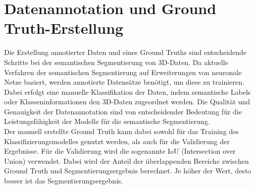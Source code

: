 \section{Datenannotation und Ground Truth-Erstellung}

Die Erstellung annotierter Daten und eines Ground Truths sind entscheidende
Schritte bei der semantischen Segmentierung von 3D-Daten. Da aktuelle Verfahren
der semantischen Segmentierung auf Erweiterungen von neuronale Netze basiert,
werden annotierte Datensätze benötigt, um diese zu trainieren. Dabei erfolgt
eine manuelle Klassifikation der Daten, indem semantische Labels oder
Klasseninformationen den 3D-Daten zugeordnet werden. Die Qualität und
Genauigkeit der Datenannotation sind von entscheidender Bedeutung für die
Leistungsfähigkeit der Modelle für die semantische Segmentierung.
\cite{BROSTOW200988,Zlateski_2018_CVPR}
\\Der manuell erstellte Ground Truth kann dabei sowohl für das Training des
Klassifizierungsmodelles genutzt werden, als auch für die Validierung der
Ergebnisse. Für die Validierung wird die sogenannte IoU (Intersection over
Union) verwendet. Dabei wird der Anteil der überlappenden Bereiche zwischen
Ground Truth und Segmentierungsergebnis berechnet. Je höher der Wert, desto
besser ist das Segmentierungsergebnis. \cite{9000872}